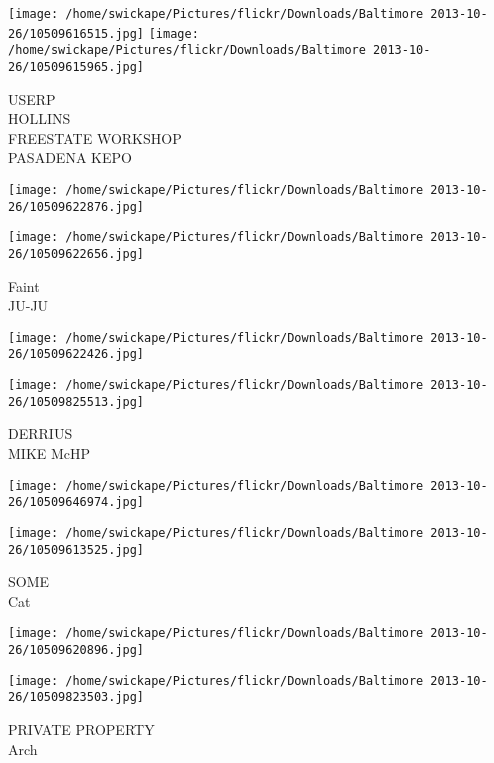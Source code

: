 \documentclass[10pt,letterpaper]{article}
\begin{document}
\texttt{[image: /home/swickape/Pictures/flickr/Downloads/Baltimore 2013-10-26/10509616515.jpg]}
\texttt{[image: /home/swickape/Pictures/flickr/Downloads/Baltimore 2013-10-26/10509615965.jpg]}

USERP\\
HOLLINS\\
FREESTATE WORKSHOP\\
PASADENA KEPO\\
\pagebreak

\texttt{[image: /home/swickape/Pictures/flickr/Downloads/Baltimore 2013-10-26/10509622876.jpg]}

\vspace{0.25in}
\texttt{[image: /home/swickape/Pictures/flickr/Downloads/Baltimore 2013-10-26/10509622656.jpg]}

Faint\\
JU{-}JU\\
\pagebreak

\texttt{[image: /home/swickape/Pictures/flickr/Downloads/Baltimore 2013-10-26/10509622426.jpg]}

\vspace{0.25in}
\texttt{[image: /home/swickape/Pictures/flickr/Downloads/Baltimore 2013-10-26/10509825513.jpg]}

DERRIUS\\
MIKE McHP\\
\pagebreak

\texttt{[image: /home/swickape/Pictures/flickr/Downloads/Baltimore 2013-10-26/10509646974.jpg]}

\vspace{0.25in}
\texttt{[image: /home/swickape/Pictures/flickr/Downloads/Baltimore 2013-10-26/10509613525.jpg]}

SOME\\
Cat\\
\pagebreak

\texttt{[image: /home/swickape/Pictures/flickr/Downloads/Baltimore 2013-10-26/10509620896.jpg]}

\vspace{0.25in}
\texttt{[image: /home/swickape/Pictures/flickr/Downloads/Baltimore 2013-10-26/10509823503.jpg]}

PRIVATE PROPERTY\\
Arch\\
\pagebreak
\end{document}
